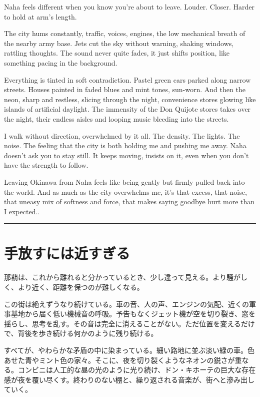 \documentclass[
  letterpaper,
  oneside]{scrbook}
\begin{document}
Naha feels different when you know you're about to leave. Louder.
Closer. Harder to hold at arm's length.

The city hums constantly, traffic, voices, engines, the low mechanical
breath of the nearby army base. Jets cut the sky without warning,
shaking windows, rattling thoughts. The sound never quite fades, it just
shifts position, like something pacing in the background.

Everything is tinted in soft contradiction. Pastel green cars parked
along narrow streets. Houses painted in faded blues and mint tones,
sun-worn. And then the neon, sharp and restless, slicing through the
night, convenience stores glowing like islands of artificial daylight.
The immensity of the Don Quijote stores takes over the night, their
endless aisles and looping music bleeding into the streets.

I walk without direction, overwhelmed by it all. The density. The
lights. The noise. The feeling that the city is both holding me and
pushing me away. Naha doesn't ask you to stay still. It keeps moving,
insists on it, even when you don't have the strength to follow.

Leaving Okinawa from Naha feels like being gently but firmly pulled back
into the world. And as much as the city overwhelms me, it's that excess,
that noise, that uneasy mix of softness and force, that makes saying
goodbye hurt more than I expected..

\begin{center}\rule{0.5\linewidth}{0.5pt}\end{center}


\chapter{手放すには近すぎる}\label{ux624bux653eux3059ux306bux306fux8fd1ux3059ux304eux308b}

那覇は、これから離れると分かっているとき、少し違って見える。より騒がしく、より近く、距離を保つのが難しくなる。

この街は絶えずうなり続けている。車の音、人の声、エンジンの気配、近くの軍事基地から届く低い機械音の呼吸。予告もなくジェット機が空を切り裂き、窓を揺らし、思考を乱す。その音は完全に消えることがない。ただ位置を変えるだけで、背後を歩き続ける何かのように残り続ける。

すべてが、やわらかな矛盾の中に染まっている。細い路地に並ぶ淡い緑の車。色あせた青やミント色の家々。そこに、夜を切り裂くようなネオンの鋭さが重なる。コンビニは人工的な昼の光のように光り続け、ドン・キホーテの巨大な存在感が夜を覆い尽くす。終わりのない棚と、繰り返される音楽が、街へと滲み出していく。
\end{document}
